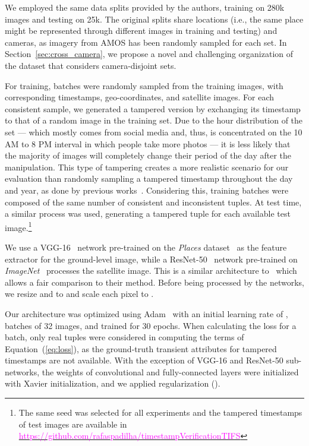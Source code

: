 \documentclass[journal]{IEEEtran}
\newcommand{\repoLink}[1]{\textcolor{magenta}{#1}}
\begin{document}
        
        We employed the same data splits provided by the authors, training on 280k images and testing on 25k. The original splits share locations (i.e., the same place might be represented through different images in training and testing) and cameras, as imagery from AMOS has been randomly sampled for each set. In Section~\ref{sec:cross_camera}, we propose a novel and challenging organization of the dataset that considers camera-disjoint sets.
        
        For training, batches were randomly sampled from the training images, with corresponding timestamps, geo-coordinates, and satellite images. For each consistent sample, we generated a tampered version by exchanging its timestamp to that of a random image in the training set. Due to the hour distribution of the set --- which mostly comes from social media and, thus, is concentrated on the 10 AM to 8 PM interval in which people take more photos --- it is less likely that the majority of images will completely change their period of the day after the manipulation. This type of tampering creates a more realistic scenario for our evaluation than randomly sampling a tampered timestamp throughout the day and year, as done by previous works~\cite{li2017you}. Considering this, training batches were composed of the same number of consistent and inconsistent tuples. At test time, a similar process was used, generating a tampered tuple for each available test image.\footnote{The same seed was selected for all experiments and the tampered timestamps of test images are available in \href{https://github.com/rafaspadilha/timestampVerificationTIFS}{\repoLink{https://github.com/rafaspadilha/timestampVerificationTIFS}}}
        
        We use a VGG-16~\cite{simonyan2014very} network pre-trained on the \emph{Places} dataset~\cite{zhou2017places} as the feature extractor for the ground-level image, while a ResNet-50~\cite{he2016identity} network pre-trained on \emph{ImageNet}~\cite{deng2009imagenet} processes the satellite image. This is a similar architecture to~\cite{salem2020learning} which allows a fair comparison to their method. Before being processed by the networks, we resize  and  to  and scale each pixel to .
        
        Our architecture was optimized using Adam~\cite{kingma2014adam} with an initial learning rate of , batches of 32 images, and trained for 30 epochs. When calculating the loss for a batch, only real tuples were considered in computing the  terms of Equation~(\ref{eq:loss}), as the ground-truth transient attributes for tampered timestamps are not available. With the exception of VGG-16 and ResNet-50 sub-networks, the weights of convolutional and fully-connected layers were initialized with Xavier initialization, and we applied  regularization ().
     
\end{document}
